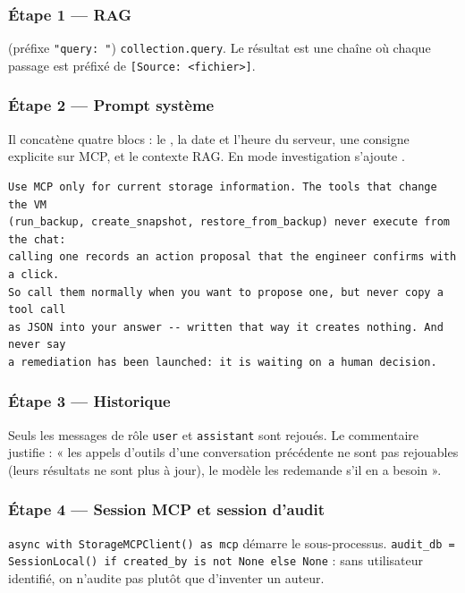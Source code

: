 \clearpage

\subsubsection*{Étape 1 --- RAG}
 \arrowto{}  \arrowto{}
 \arrowto{}  (préfixe
\texttt{"query: "}) \arrowto{} \texttt{collection.query}. Le résultat est une
chaîne où chaque passage est préfixé de \texttt{[Source: <fichier>]}.

\subsubsection*{Étape 2 --- Prompt système}
Il concatène quatre blocs : le , la date et l'heure
du serveur, une consigne explicite sur MCP, et le contexte RAG. En mode
investigation s'ajoute .

\begin{lstlisting}[caption={Consigne anti-hallucination injectée à chaque tour}]
Use MCP only for current storage information. The tools that change the VM
(run_backup, create_snapshot, restore_from_backup) never execute from the chat:
calling one records an action proposal that the engineer confirms with a click.
So call them normally when you want to propose one, but never copy a tool call
as JSON into your answer -- written that way it creates nothing. And never say
a remediation has been launched: it is waiting on a human decision.
\end{lstlisting}

\subsubsection*{Étape 3 --- Historique}
Seuls les messages de rôle \texttt{user} et \texttt{assistant} sont rejoués. Le
commentaire justifie : « les appels d'outils d'une conversation précédente ne
sont pas rejouables (leurs résultats ne sont plus à jour), le modèle les
redemande s'il en a besoin ».

\subsubsection*{Étape 4 --- Session MCP et session d'audit}
\texttt{async with StorageMCPClient() as mcp} démarre le sous-processus.
\texttt{audit\_db = SessionLocal() if created\_by is not None else None} : sans
utilisateur identifié, on n'audite pas plutôt que d'inventer un auteur.

